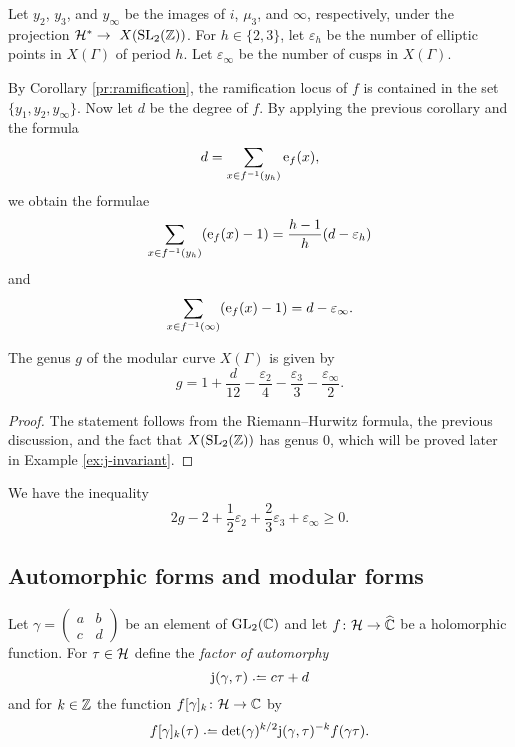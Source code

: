Let $y_2$, $y_3$, and $y_\infty$ be the images of $i$, $\mu_3$, and $\infty$, respectively, under the projection $\mathcal{H}^*\to\ X(\operatorname{SL}_2(\mathbb{Z}))$. For $h\in\{2,3\}$, let $\varepsilon_h$ be the number of elliptic points in $X(\Gamma)$ of period $h$. Let $\varepsilon_\infty$ be the number of cusps in $X(\Gamma)$.

By Corollary \ref{pr:ramification}, the ramification locus of $f$ is contained in the set $\{y_1,y_2,y_\infty\}$. Now let $d$ be the degree of $f$. By applying the previous corollary and the formula 
\[d=\sum_{x\in f^{-1}(y_h)}\operatorname{e}_f(x),\] we obtain the formulae
\[\sum_{x\in f^{-1}(y_h)}(\operatorname{e}_f(x)-1)=\frac{h-1}{h}(d-\varepsilon_h)\]
and
\[\sum_{x\in f^{-1}(\infty)}(\operatorname{e}_f(x)-1)=d-\varepsilon_\infty.\]

\begin{prop}
 The genus $g$ of the modular curve $X(\Gamma)$ is given by
 \[g=1+\frac{d}{12}-\frac{\varepsilon_2}{4}-\frac{\varepsilon_3}{3}-\frac{\varepsilon_\infty}{2}.\]
\end{prop}

\begin{proof}
 The statement follows from the Riemann--Hurwitz formula, the previous discussion, and the fact that $X(\operatorname{SL}_2(\mathbb{Z}))$ has genus $0$, which will be proved later in Example \ref{ex:j-invariant}.
\end{proof}

\begin{cor} \label{pr:inequality}
 We have the inequality \[2g-2+\frac{1}{2}\varepsilon_2+\frac{2}{3}\varepsilon_3+\varepsilon_\infty\geq0.\]
\end{cor}

\subsection{Automorphic forms and modular forms}

\begin{defi}
 Let $\gamma = \left(\begin{smallmatrix}a & b \\ c & d\end{smallmatrix}\right)$ be an element of $\operatorname{GL}_2(\mathbb{C})$ and let $f\colon\mathcal{H}\to\widehat{\mathbb{C}}$ be a holomorphic function. For $\tau\in\mathcal{H}$ define the \emph{factor of automorphy}
 \[\mathrm{j}(\gamma,\tau)\defeq c\tau+d\]
 and for $k\in \mathbb{Z}$ the function $f[\gamma]_k\colon\mathcal{H}\to\mathbb{C}$ by
 \[f[\gamma]_k(\tau) \defeq \det(\gamma)^{k/2}\jrm(\gamma,\tau)^{-k}f(\gamma\tau).\]
\end{defi}

